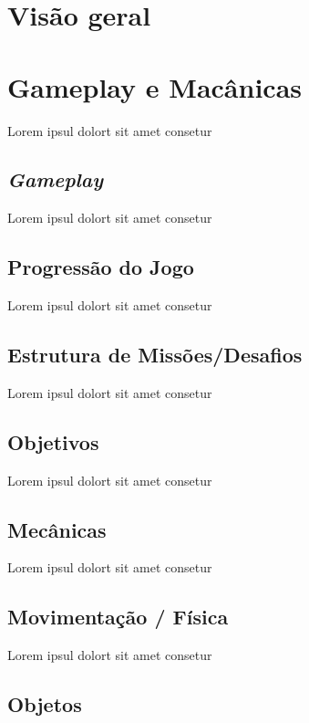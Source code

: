 \chapter{Visão geral}




\chapter{Gameplay e Macânicas}

Lorem ipsul dolort sit amet consetur

\section{\textit{Gameplay}}

Lorem ipsul dolort sit amet consetur

\section{Progressão do Jogo}

Lorem ipsul dolort sit amet consetur

\section{Estrutura de Missões/Desafios}

Lorem ipsul dolort sit amet consetur

\section{Objetivos}

Lorem ipsul dolort sit amet consetur

\section{Mecânicas}

Lorem ipsul dolort sit amet consetur

\section{Movimentação / Física}

Lorem ipsul dolort sit amet consetur

\section{Objetos}

